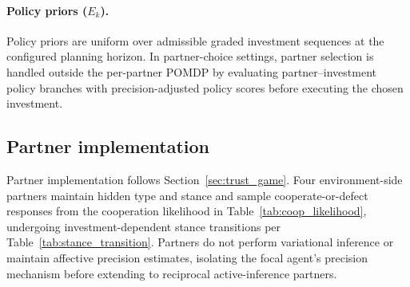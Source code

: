 \paragraph{Policy priors ($E_k$).}
Policy priors are uniform over admissible graded investment sequences at the configured planning horizon. In partner-choice settings, partner selection is handled outside the per-partner POMDP by evaluating partner--investment policy branches with precision-adjusted policy scores before executing the chosen investment.

\subsection{Partner implementation}

Partner implementation follows Section~\ref{sec:trust_game}. Four environment-side partners maintain hidden type and stance and sample cooperate-or-defect responses from the cooperation likelihood in Table~\ref{tab:coop_likelihood}, undergoing investment-dependent stance transitions per Table~\ref{tab:stance_transition}. Partners do not perform variational inference or maintain affective precision estimates, isolating the focal agent's precision mechanism before extending to reciprocal active-inference partners.
